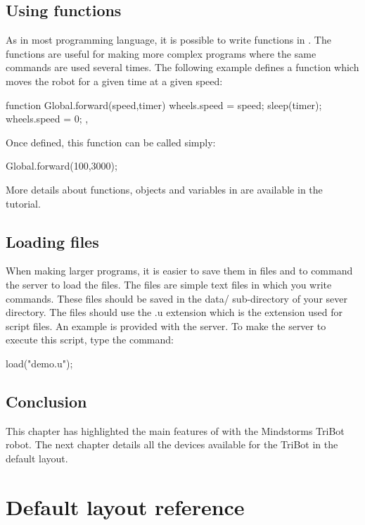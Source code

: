 \subsection{Using functions}
As in most programming language, it is possible to write functions in
\urbi. The functions are useful for making more complex programs where the
same commands are used several times.  The following example defines a
function which moves the robot for a given time at a given speed:
\begin{urbiunchecked}
function Global.forward(speed,timer)
{
  wheels.speed = speed;
  sleep(timer);
  wheels.speed = 0;
},
\end{urbiunchecked}


Once defined, this function can be called simply:
\begin{urbiunchecked}
Global.forward(100,3000);
\end{urbiunchecked}

More details about functions, objects and variables in \urbi are available
in the \urbi tutorial.

\subsection{Loading files}
When making larger \urbi programs, it is easier to save them in files and to
command the server to load the files.  The files are simple text files in
which you write \urbi commands. These files should be saved in the data/
sub-directory of your sever directory. The files should use the .u extension
which is the extension used for \urbi script files.  An example
 is provided with the server. To make the \urbi server to
execute this script, type the \urbi command:
\begin{urbiunchecked}
load("demo.u");
\end{urbiunchecked}


\subsection{Conclusion}
This chapter has highlighted the main features of \urbi with the Mindstorms
TriBot robot. The next chapter details all the devices available for the
TriBot in the default layout.

\section{Default layout reference}

